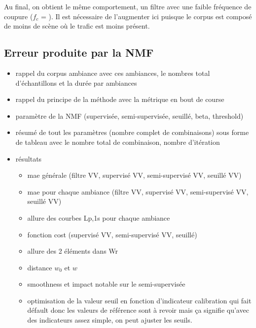 Au final, on obtient le même comportement, un filtre avec une faible fréquence de coupure ($f_c$ = ). Il est nécessaire de l'augmenter ici puisque le corpus est composé de moins de scène où le trafic est moins présent.

\subsection{Erreur produite par la NMF}


\label{chap:grafic}
\begin{itemize}
\item rappel du corpus ambiance avec ces ambiances, le nombres total d'échantillons et la durée par ambiances
\item rappel du principe de la méthode avec la métrique en bout de course
\item paramètre de la NMF (supervisée, semi-supervisée, seuillé, beta, threshold)
\item résumé de tout les paramètres (nombre complet de combinaisons) sous forme de tableau avec le nombre total de combinaison, nombre d'itération
\item résultats
\begin{itemize}
\item mae générale (filtre VV, supervisé VV, semi-supervisé VV, seuillé VV)
\item mae pour chaque ambiance (filtre VV, supervisé VV, semi-supervisé VV, seuillé VV)
\item allure des courbes Lp,1s pour chaque ambiance
\item fonction cost (supervisé VV, semi-supervisé VV, seuillé)
\item allure des 2 éléments dans Wr
\item distance $w_0$ et $w$
\item smoothness et impact notable sur le semi-supervisée
\item optimisation de la valeur seuil en fonction d'indicateur
calibration qui fait défault donc les valeurs de référence sont à revoir mais ça signifie qu'avec des indicateurs assez simple, on peut ajuster les seuils.
\end{itemize}




\end{itemize}
